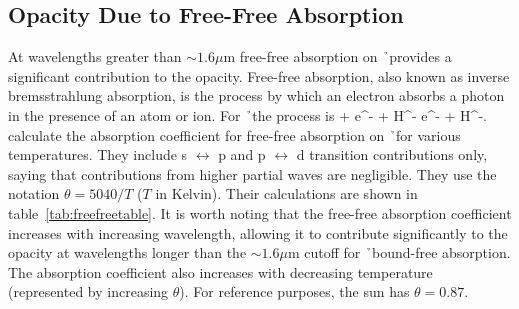 \subsection{Opacity Due to Free-Free Absorption}
At wavelengths greater than $\sim1.6\mu$m free-free absorption on \h\ provides a significant contribution to the opacity.  Free-free absorption, also known as inverse bremsstrahlung absorption, is the process by which an electron absorbs a photon in the presence of an atom or ion.  For \h\ the process is
\beq
\gamma + e^- + H^- \rightarrow e^- + H^-.
\eeq
\cite{bell1987} calculate the absorption coefficient for free-free
absorption on \h\ for various temperatures.  They include s
$\leftrightarrow$ p and p $\leftrightarrow$ d transition contributions
only, saying that contributions from higher partial waves are
negligible.  They use the notation $\theta=5040 /T$ ($T$ in Kelvin). Their calculations are shown in table~\ref{tab:freefreetable}.  It is worth noting that the free-free absorption coefficient increases with increasing wavelength, allowing it to contribute significantly to the opacity at wavelengths longer than the $\sim 1.6\mu$m cutoff for \h\ bound-free absorption.  The absorption coefficient also increases with decreasing temperature (represented by increasing $\theta$).  For reference purposes,  the sun has $\theta=0.87$.
